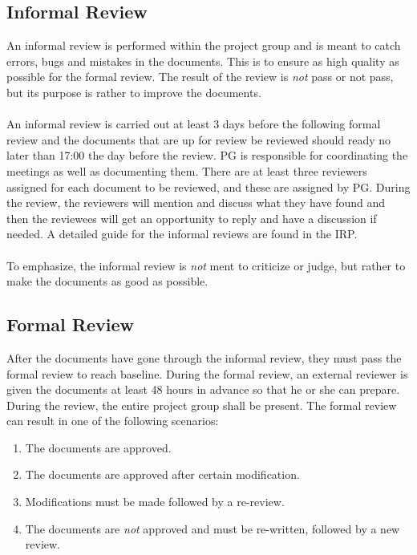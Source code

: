 \documentclass{article}
\begin{document}
    \subsection{Informal Review \label{informalreview}}
        An informal review is performed within the project group and is meant to catch
        errors, bugs and mistakes in the documents. This is to ensure as high quality
        as possible for the formal review. The result of the review is \emph{not} pass or
        not pass, but its purpose is rather to improve the documents.
        \\ \\
        An informal review is carried out at least 3 days before the following formal review and the documents that
        are up for review be reviewed should ready no later than 17:00 the day before the review.    PG is responsible
        for coordinating the meetings as well as documenting them.
        There are at least three reviewers assigned for each document to be reviewed, and these
        are assigned by PG. During the review, the reviewers will mention and discuss what they have
        found and then the reviewees will get an opportunity to reply and have a discussion
        if needed. A detailed guide for the informal reviews are found in the IRP. 
        \\ \\
        To emphasize, the informal review is \emph{not} ment to criticize or judge, but rather
        to make the documents as good as possible. 
        
    
    \subsection{Formal Review \label{formalreview}}
        After the documents have gone through the informal review, they must pass the formal review
        to reach baseline. During the formal review, an external reviewer is
        given the documents at least 48 hours in advance so that he or she can prepare.
        During the review, the entire project group shall be present.
        The formal review can result in one of the following scenarios:
        \begin{enumerate}
            \item The documents are approved.
            \item The documents are approved after certain modification.
            \item Modifications must be made followed by a re-review.
            \item The documents are \emph{not} approved and must be re-written,
                    followed by a new review.
        \end{enumerate}
    
\end{document}
